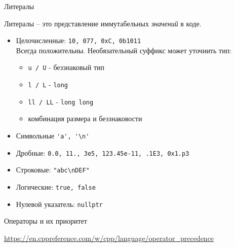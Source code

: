 \documentclass[unknownkeysallowed]{beamer}
\begin{document}
\begin{frame}[fragile]{Литералы}

Литералы -- это представление иммутабельных \emph{значений} в коде.

\begin{itemize}

  \item Целочисленные: \lstinline[basicstyle=\ttfamily\small]{10, 077, 0xC, 0b1011}\\
  Всегда положительны. Необязательный суффикс может уточнить тип:
    \begin{itemize}
      \item \lstinline[basicstyle=\ttfamily\small]{u / U} - беззнаковый тип
      \item \lstinline[basicstyle=\ttfamily\small]{l / L} - \lstinline[basicstyle=\ttfamily\small]{long}
      \item \lstinline[basicstyle=\ttfamily\small]{ll / LL} - \lstinline[basicstyle=\ttfamily\small]{long long}
      \item комбинация размера и беззнаковости
    \end{itemize}
    
  \item Символьные \lstinline[basicstyle=\ttfamily\small]{'a', '\n'}
  
  \item Дробные: \lstinline[basicstyle=\ttfamily\small]{0.0, 11., 3e5, 123.45e-11, .1E3, 0x1.p3}
  
  \item Строковые: \lstinline[basicstyle=\ttfamily\small]{"abc\nDEF"}
  
  \item Логические: \lstinline[basicstyle=\ttfamily\small]{true, false}
  
  \item Нулевой указатель: \lstinline[basicstyle=\ttfamily\small]{nullptr}

\end{itemize}

\end{frame}

\begin{frame}{Операторы и их приоритет}

\url{https://en.cppreference.com/w/cpp/language/operator_precedence}

\end{frame}
\end{document}
